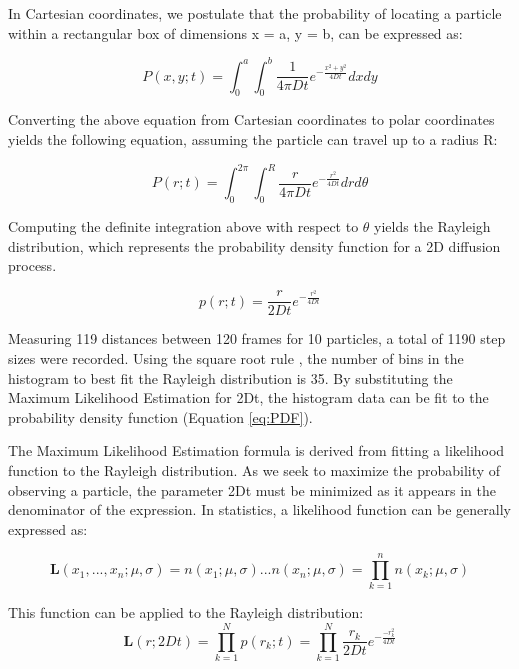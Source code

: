 \documentclass[12pt, letterpaper, twoside]{article}
\begin{document}
In Cartesian coordinates, we postulate that the probability of locating a particle within a rectangular box of dimensions x = a, y = b, can be expressed as:

\begin{equation*}
    P(x,y;t) = \int_0^a\int_0^b \frac{1}{4\pi Dt}e^{-\frac{x^2+y^2}{4Dt}}dxdy
\end{equation*}

Converting the above equation from Cartesian coordinates to polar coordinates yields the following equation, assuming the particle can travel up to a radius R:

\begin{equation*}
    P(r;t) = \int_0^{2\pi}\int_0^R\frac{r}{4\pi Dt}e^{-\frac{r^2}{4Dt}}drd\theta
\end{equation*}

Computing the definite integration above with respect to $\theta$ yields the Rayleigh distribution, which represents the probability density function for a 2D diffusion process.

\begin{equation}
    p(r;t) = \frac{r}{2Dt}e^{-\frac{r^2}{4Dt}} \label{eq:PDF}
\end{equation}

Measuring 119 distances between 120 frames for 10 particles, a total of 1190 step sizes were recorded. Using the square root rule \cite{SquareRootRule}, the number of bins in the histogram to best fit the Rayleigh distribution is 35. By substituting the Maximum Likelihood Estimation for 2Dt, the histogram data can be fit to the probability density function (Equation \ref{eq:PDF}). 

The Maximum Likelihood Estimation formula is derived from fitting a likelihood function to the Rayleigh distribution. As we seek to maximize the probability of observing a particle, the parameter 2Dt must be minimized as it appears in the denominator of the expression. In statistics, a likelihood function can be generally expressed as:

\begin{equation*}
    \textbf{L}(x_1, ..., x_n;\mu, \sigma) = n(x_1;\mu, \sigma) ... n(x_n;\mu, \sigma) = \prod_{k=1}^nn(x_k;\mu, \sigma)
\end{equation*}

This function can be applied to the Rayleigh distribution:
\begin{equation}
    \textbf{L}(r; 2Dt) = \prod_{k=1}^Np(r_k;t) = \prod_{k=1}^N\frac{r_k}{2Dt}e^{-\frac{-r_k^2}{4Dt}}
\end{equation}
\end{document}
